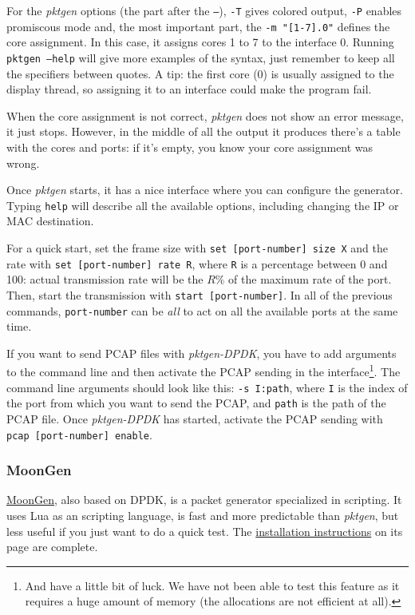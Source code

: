 \documentclass[oneside]{hpman}
\begin{document}
For the \textit{pktgen} options (the part after the \texttt{--}), \texttt{-T} gives colored output, \texttt{-P} enables promiscous mode and, the most important part, the \texttt{-m "[1-7].0"} defines the core assignment. In this case, it assigns cores 1 to 7 to the interface 0. Running \texttt{pktgen --help} will give more examples of the syntax, just remember to keep all the specifiers between quotes. A tip: the first core (0) is usually assigned to the display thread, so assigning it to an interface could make the program fail.

When the core assignment is not correct, \textit{pktgen} does not show an error message, it just stops. However, in the middle of all the output it produces there's a table with the cores and ports: if it's empty, you know your core assignment was wrong.

Once \textit{pktgen} starts, it has a nice interface where you can configure the generator. Typing \texttt{help} will describe all the available options, including changing the IP or MAC destination.

For a quick start, set the frame size with \texttt{set [port-number] size X} and the rate with \texttt{set [port-number] rate R}, where \texttt{R} is a percentage between 0 and 100: actual transmission rate will be the $R \%$ of the maximum rate of the port. Then, start the transmission with \texttt{start [port-number]}. In all of the previous commands, \texttt{port-number} can be \textit{all} to act on all the available ports at the same time.

If you want to send PCAP files with \textit{pktgen-DPDK}, you have to add arguments to the command line and then activate the PCAP sending in the interface\footnote{And have a little bit of luck. We have not been able to test this feature as it requires a huge amount of memory (the allocations are not efficient at all).}. The command line arguments should look like this: \texttt{-s I:path}, where \texttt{I} is the index of the port from which you want to send the PCAP, and \texttt{path} is the path of the PCAP file. Once \textit{pktgen-DPDK} has started, activate the PCAP sending with \texttt{pcap [port-number] enable}.

\subsubsection{MoonGen}

 \href{https://github.com/emmericp/MoonGen}{MoonGen}, also based on DPDK, is a packet generator specialized in scripting. It uses Lua as an scripting language, is fast and more predictable than \textit{pktgen}, but less useful if you just want to do a quick test. The \href{https://github.com/emmericp/MoonGen#installation}{installation instructions} on its page are complete.
\end{document}
